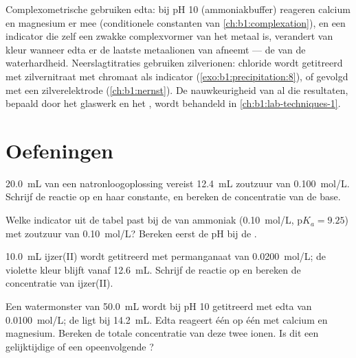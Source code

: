 Complexometrische  gebruiken edta: bij pH 10 (ammoniakbuffer)
reageren calcium en magnesium er  mee (conditionele
constanten van \cref{ch:b1:complexation}), en een indicator die zelf een
zwakke complexvormer van het metaal is, verandert van kleur wanneer edta
er de laatste metaalionen van afneemt --- de  van de
waterhardheid. Neerslagtitraties gebruiken zilverionen: chloride wordt
getitreerd met zilvernitraat met chromaat als indicator
(\cref{exo:b1:precipitation:8}), of gevolgd met een zilverelektrode
(\cref{ch:b1:nernst}). De nauwkeurigheid van al die resultaten, bepaald
door het glaswerk en het , wordt behandeld in
\cref{ch:b1:lab-techniques-1}.

\section{Oefeningen}

\begin{exercise}[$\star$]\label{exo:b1:titration-methods:1}
\qty{20.0}{mL} van een natronloogoplossing vereist \qty{12.4}{mL}
zoutzuur van \qty{0.100}{mol/L}. Schrijf de reactie op en haar
constante, en bereken de concentratie van de base.
\end{exercise}

\begin{exercise}[$\star$]\label{exo:b1:titration-methods:2}
Welke indicator uit de tabel past bij de  van ammoniak
(\qty{0.10}{mol/L}, $\mathrm{p}K_a = 9.25$) met zoutzuur van
\qty{0.10}{mol/L}? Bereken eerst de pH bij de .
\end{exercise}

\begin{exercise}[$\star$]\label{exo:b1:titration-methods:3}
\qty{10.0}{mL} ijzer(II) wordt getitreerd met permanganaat van
\qty{0.0200}{mol/L}; de violette kleur blijft vanaf \qty{12.6}{mL}.
Schrijf de reactie op en bereken de concentratie van ijzer(II).
\end{exercise}

\begin{exercise}[$\star$]\label{exo:b1:titration-methods:4}
Een watermonster van \qty{50.0}{mL} wordt bij pH 10 getitreerd met edta
van \qty{0.0100}{mol/L}; de  ligt bij \qty{14.2}{mL}. Edta
reageert één op één met calcium en magnesium. Bereken de totale
concentratie van deze twee ionen. Is dit een gelijktijdige of een
opeenvolgende ?
\end{exercise}

